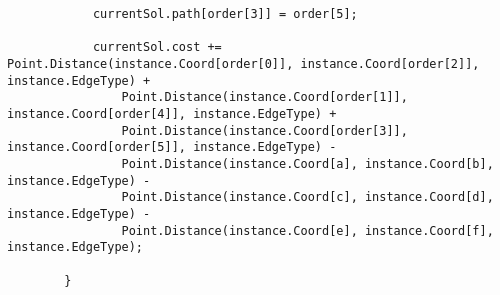 \begin{lstlisting}
            currentSol.path[order[3]] = order[5];

            currentSol.cost += Point.Distance(instance.Coord[order[0]], instance.Coord[order[2]], instance.EdgeType) +
                Point.Distance(instance.Coord[order[1]], instance.Coord[order[4]], instance.EdgeType) +
                Point.Distance(instance.Coord[order[3]], instance.Coord[order[5]], instance.EdgeType) -
                Point.Distance(instance.Coord[a], instance.Coord[b], instance.EdgeType) -
                Point.Distance(instance.Coord[c], instance.Coord[d], instance.EdgeType) -
                Point.Distance(instance.Coord[e], instance.Coord[f], instance.EdgeType);

        }
\end{lstlisting}
